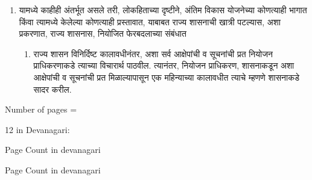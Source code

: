 \documentclass[12pt]{article}
\begin{document}
{\begin{enumerate}
\begin{enumerate}
    \item यामध्ये काहीही अंतर्भूत असले तरी, लोकहिताच्या दृष्टीने, अंतिम विकास
      योजनेच्या कोण\-त्याही भागात किंवा त्यामध्ये केलेल्या कोणत्याही प्रस्तावात,
      याबाबत राज्य शासनाची खात्री पटल्यास, अशा प्रकरणात, राज्य शासनास,
      नियोजित फेरबदलाच्या संबंधात
      \begin{enumerate}
      \item राज्य शासन विनिर्दिष्ट कालावधीनंतर, अशा सर्व आक्षेपांची व सूचनांची
        प्रत नियो\-जन प्राधिकरणाकडे त्याच्या विचारार्थ पाठवील. त्यानंतर, नियोजन
        प्राधिकरण, शासना\-कडून अशा आक्षेपांची व सूचनांची प्रत मिळाल्यापासून एक
        महिन्याच्या काला\-वधीत त्याचे म्हणणे शासनाकडे सादर करील.
\end{enumerate}

      
\end{enumerate}

\end{enumerate}

}


Number of pages = \pageref{pg:lastpage}

12 in Devanagari: 

Page Count in devanagari 

Page Count in devanagari 





\label{pg:lastpage}

\end{document}

